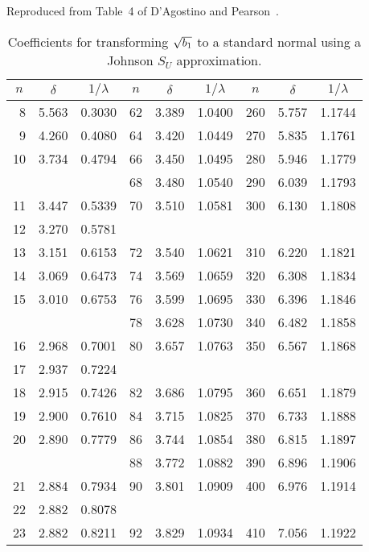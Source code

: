 \documentclass[draft]{article}
\begin{document}
\begin{table}
\caption{
Coefficients for transforming \(\protect\sqrt{b_1}\) to a standard normal
using a Johnson \(S_U\) approximation.}
\centerline{Reproduced from Table~4 of D'Agostino and 
Pearson~\protect\cite{dagostino73}.}
\label{tbl:johnson}
\scriptsize
\begin{center}
\begin{tabular}{rllrllrll}\hline
\multicolumn{1}{c}{\(n\)} & \multicolumn{1}{c}{\(\delta\)} 
& \multicolumn{1}{c}{\(1/\lambda\)} &
\multicolumn{1}{c}{\(n\)} & \multicolumn{1}{c}{\(\delta\)} 
& \multicolumn{1}{c}{\(1/\lambda\)} &
\multicolumn{1}{c}{\(n\)} & \multicolumn{1}{c}{\(\delta\)} 
& \multicolumn{1}{c}{\(1/\lambda\)} \\ \hline
 8 & 5.563 & 0.3030 & 62 & 3.389 & 1.0400 & 260 & 5.757 & 1.1744 \\
 9 & 4.260 & 0.4080 & 64 & 3.420 & 1.0449 & 270 & 5.835 & 1.1761 \\
10 & 3.734 & 0.4794 & 66 & 3.450 & 1.0495 & 280 & 5.946 & 1.1779 \\
   &       &        & 68 & 3.480 & 1.0540 & 290 & 6.039 & 1.1793 \\
11 & 3.447 & 0.5339 & 70 & 3.510 & 1.0581 & 300 & 6.130 & 1.1808 \\
12 & 3.270 & 0.5781 \\
13 & 3.151 & 0.6153 & 72 & 3.540 & 1.0621 & 310 & 6.220 & 1.1821 \\
14 & 3.069 & 0.6473 & 74 & 3.569 & 1.0659 & 320 & 6.308 & 1.1834 \\
15 & 3.010 & 0.6753 & 76 & 3.599 & 1.0695 & 330 & 6.396 & 1.1846 \\
   &       &        & 78 & 3.628 & 1.0730 & 340 & 6.482 & 1.1858 \\
16 & 2.968 & 0.7001 & 80 & 3.657 & 1.0763 & 350 & 6.567 & 1.1868 \\
17 & 2.937 & 0.7224 \\
18 & 2.915 & 0.7426 & 82 & 3.686 & 1.0795 & 360 & 6.651 & 1.1879 \\
19 & 2.900 & 0.7610 & 84 & 3.715 & 1.0825 & 370 & 6.733 & 1.1888 \\
20 & 2.890 & 0.7779 & 86 & 3.744 & 1.0854 & 380 & 6.815 & 1.1897 \\
   &       &        & 88 & 3.772 & 1.0882 & 390 & 6.896 & 1.1906 \\
21 & 2.884 & 0.7934 & 90 & 3.801 & 1.0909 & 400 & 6.976 & 1.1914 \\
22 & 2.882 & 0.8078 \\
23 & 2.882 & 0.8211 & 92 & 3.829 & 1.0934 & 410 & 7.056 & 1.1922 \\

\end{tabular}
\end{center}
\end{table}
\end{document}
